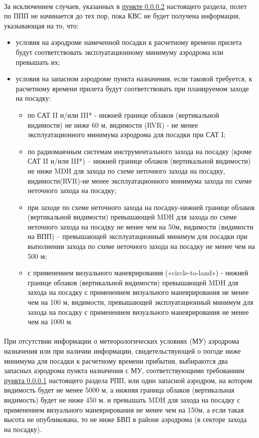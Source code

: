 \paragraph{} \label{par:alt1}За исключением случаев, указанных в \hyperref[par:alt2]{пункте \ref*{par:alt2}}  настоящего раздела, полет по ППП не начинается до тех пор, пока КВС не будет получена информация, указывающая на то, что:
\begin{itemize}
    \item условия на аэродроме намеченной посадки к расчетному времени прилета будут соответствовать эксплуатационному минимуму аэродрома или превышать их;
    \item условия на запасном аэродроме пункта назначения, если таковой требуется, к расчетному времени прилета будут соответствовать при планируемом заходе на посадку:
    \begin{itemize}
        \item по САТ II и/или III* - нижней границе облаков (вертикальной видимости) не ниже 60 м, видимости (RVR) - не менее эксплуатационного минимума аэродрома для посадки при САТ I;
        \item по радиомаячным системам инструментального захода на посадку (кроме САТ II и/или III*) – нижней границе облаков (вертикальной видимости) не ниже MDH для захода по схеме неточного захода на посадку, видимости(RVR)-не менее эксплуатационного минимума захода по схеме неточного захода на посадку;
        \item при заходе по схеме неточного захода на посадку-нижней границе облаков (вертикальной видимости) превышающей MDH для захода по схеме неточного захода на посадку не менее чем на 50м, видимости (видимости на ВПП) – превышающей эксплуатационный минимум для посадки при выполнении захода по схеме неточного захода на посадку не менее чем на 500 м;
        \item с применением визуального маневрирования («circle-to-land») - нижней границе облаков (вертикальной видимости) превышающей MDH для захода на посадку с применением визуального маневрирования не менее чем на 100 м, видимости, превышающей эксплуатационный минимум для захода на посадку с применением визуального маневрирования не менее чем на 1000 м.
    \end{itemize}
\end{itemize}

\paragraph{} \label{par:alt2}При отсутствии информации о метеорологических условиях (МУ) аэродрома назначения или при наличии информации, свидетельствующей о погоде ниже минимума для посадки к расчетному времени прибытия, выбираются два запасных аэродрома пункта назначения с МУ, соответствующими требованиям \hyperref[par:alt1]{пункта \ref*{par:alt1}}  настоящего раздела РПП, или один запасной аэродром, на котором видимость будет не менее 5000 м, а нижняя граница облаков (вертикальная видимость) будет не ниже 450 м. и превышать MDH для захода на посадку с применением визуального маневрирования не менее чем на 150м, а если такая высота не опубликована, то не ниже БВП в районе аэродрома (в секторе захода на посадку).

